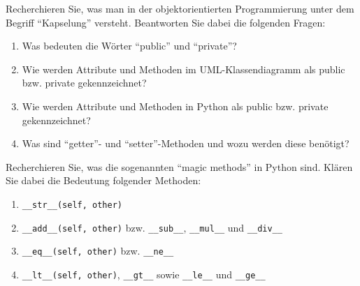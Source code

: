 \documentclass[11pt, a4paper, oneside]{article}
\begin{document}
	
	
	
	Recherchieren Sie, was man in der objektorientierten Programmierung unter dem Begriff ``Kapselung'' versteht.
	Beantworten Sie dabei die folgenden Fragen:
	\begin{enumerate}[label=\alph*)]
		\item Was bedeuten die Wörter ``public'' und ``private''?\\[1cm]\lines[2cm]
		\item Wie werden Attribute und Methoden im UML-Klassendiagramm als public bzw. private gekennzeichnet?\\[1cm]\lines[2cm]
		\item Wie werden Attribute und Methoden in Python als public bzw. private gekennzeichnet?\\[1cm]\lines[2cm]
		\item Was sind ``getter''- und ``setter''-Methoden und wozu werden diese benötigt?\\[1cm]\lines[2cm]
	\end{enumerate}
	
	\pagebreak

	
	Recherchieren Sie, was die sogenannten ``magic methods'' in Python sind.
	Klären Sie dabei die Bedeutung folgender Methoden:
	\begin{enumerate}[label=\alph*)]
		\item \texttt{\_\_str\_\_(self, other)}\\[1cm]\lines[2cm]
		\item \texttt{\_\_add\_\_(self, other)} bzw. \texttt{\_\_sub\_\_}, \texttt{\_\_mul\_\_} und \texttt{\_\_div\_\_}\\[1cm]\lines[2cm]
		\item \texttt{\_\_eq\_\_(self, other)} bzw. \texttt{\_\_ne\_\_}\\[1cm]\lines[2cm]
		\item \texttt{\_\_lt\_\_(self, other)}, \texttt{\_\_gt\_\_} sowie \texttt{\_\_le\_\_} und \texttt{\_\_ge\_\_}\\[1cm]\lines[2cm]
	\end{enumerate}

	
	
\end{document}
